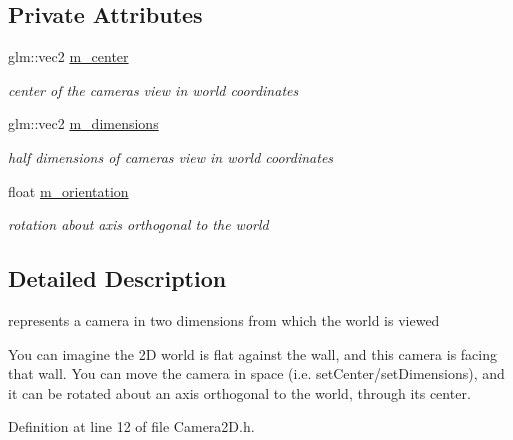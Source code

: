 \subsection*{Private Attributes}
\begin{DoxyCompactItemize}
\item 
\mbox{\label{classnta_1_1Camera2D_a6f63c871727ef4037b164be0b400cd89}} 
glm\+::vec2 \hyperlink{classnta_1_1Camera2D_a6f63c871727ef4037b164be0b400cd89}{m\+\_\+center}
\begin{DoxyCompactList}\small\item\em center of the camera\textquotesingle{}s view in world coordinates \end{DoxyCompactList}\item 
\mbox{\label{classnta_1_1Camera2D_a403ec8d18fd31d5164ba81267cca555e}} 
glm\+::vec2 \hyperlink{classnta_1_1Camera2D_a403ec8d18fd31d5164ba81267cca555e}{m\+\_\+dimensions}
\begin{DoxyCompactList}\small\item\em half dimensions of camera\textquotesingle{}s view in world coordinates \end{DoxyCompactList}\item 
\mbox{\label{classnta_1_1Camera2D_abdec8877a0bf8cf0ad6c74440aa18eb4}} 
float \hyperlink{classnta_1_1Camera2D_abdec8877a0bf8cf0ad6c74440aa18eb4}{m\+\_\+orientation}
\begin{DoxyCompactList}\small\item\em rotation about axis orthogonal to the world \end{DoxyCompactList}\end{DoxyCompactItemize}


\subsection{Detailed Description}
represents a camera in two dimensions from which the world is viewed

You can imagine the 2D world is flat against the wall, and this camera is facing that wall. You can move the camera in space (i.\+e. set\+Center/set\+Dimensions), and it can be rotated about an axis orthogonal to the world, through its center. 

Definition at line 12 of file Camera2\+D.\+h.



